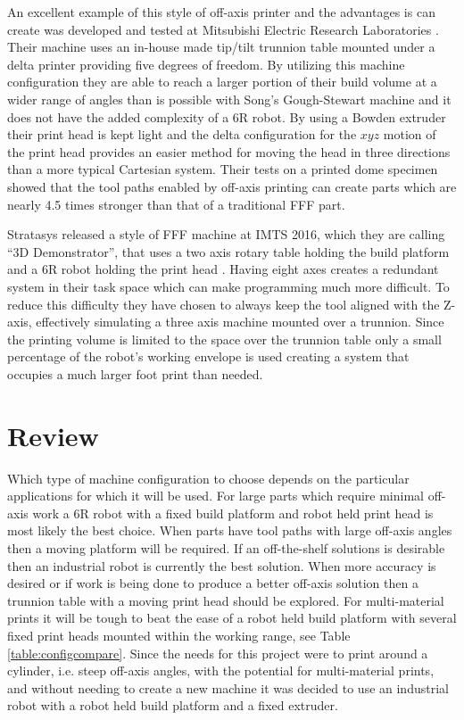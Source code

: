 \documentclass[main.tex]{subfiles}
\begin{document}
An excellent example of this style of off-axis printer and the advantages is can create was developed and tested at Mitsubishi Electric Research Laboratories \cite{Yerazunis2016}.
Their machine uses an in-house made tip/tilt trunnion table mounted under a delta printer providing five degrees of freedom.
By utilizing this machine configuration they are able to reach a larger portion of their build volume at a wider range of angles than is possible with Song's Gough-Stewart machine and it does not have the added complexity of a 6R robot.
By using a Bowden extruder their print head is kept light and the delta configuration for the $xyz$ motion of the print head provides an easier method for moving the head in three directions than a more typical Cartesian system.
Their tests on a printed dome specimen showed that the tool paths enabled by off-axis printing can create parts which are nearly 4.5 times stronger than that of a traditional FFF part.


Stratasys released a style of FFF machine at IMTS 2016, which they are calling ``3D Demonstrator'', that uses a two axis rotary table holding the build platform and a 6R robot holding the print head \cite{Vurpillat2016}.
Having eight axes creates a redundant system in their task space which can make programming much more difficult.
To reduce this difficulty they have chosen to always keep the tool aligned with the Z-axis, effectively simulating a three axis machine mounted over a trunnion.
Since the printing volume is limited to the space over the trunnion table only a small percentage of the robot's working envelope is used creating a system that occupies a much larger foot print than needed.

\section{Review}
Which type of machine configuration to choose depends on the particular applications for which it will be used.
For large parts which require minimal off-axis work a 6R robot with a fixed build platform and robot held print head is most likely the best choice.
When parts have tool paths with large off-axis angles then a moving platform will be required.
If an off-the-shelf solutions is desirable then an industrial robot is currently the best solution.
When more accuracy is desired or if work is being done to produce a better off-axis solution then a trunnion table with a moving print head should be explored.
For multi-material prints it will be tough to beat the ease of a robot held build platform with several fixed print heads mounted within the working range, see Table \ref{table:configcompare}.
Since the needs for this project were to print around a cylinder, i.e. steep off-axis angles, with the potential for multi-material prints, and without needing to create a new machine it was decided to use an industrial robot with a robot held build platform and a fixed extruder.
\end{document}
